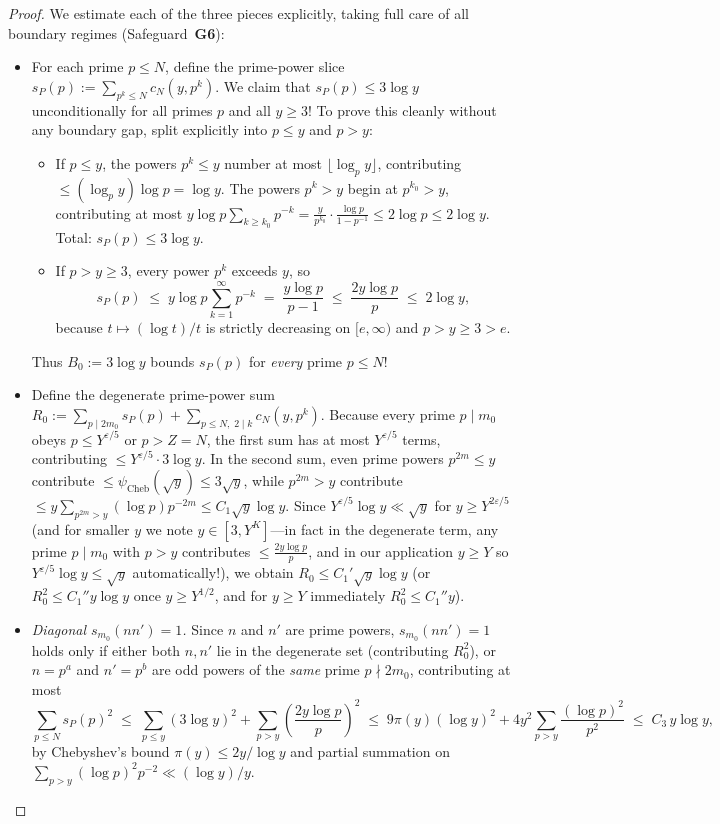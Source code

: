 \begin{proof}
We estimate each of the three pieces explicitly, taking full care of all boundary regimes (Safeguard~\textbf{G6}):
\begin{itemize}
\item For each prime $p \le N$, define the prime-power slice $s_P(p) := \sum_{p^k \le N} c_N(y, p^k)$. We claim that $s_P(p) \le 3\log y$ unconditionally for all primes $p$ and all $y \ge 3$! To prove this cleanly without any boundary gap, split explicitly into $p \le y$ and $p > y$:
  \begin{itemize}
  \item If $p \le y$, the powers $p^k \le y$ number at most $\lfloor \log_p y \rfloor$, contributing $\le (\log_p y)\log p = \log y$. The powers $p^k > y$ begin at $p^{k_0} > y$, contributing at most $y \log p \sum_{k \ge k_0} p^{-k} = \frac{y}{p^{k_0}} \cdot \frac{\log p}{1 - p^{-1}} \le 2\log p \le 2\log y$. Total: $s_P(p) \le 3\log y$.
  \item If $p > y \ge 3$, every power $p^k$ exceeds $y$, so
    \[
      s_P(p) \;\le\; y \log p \sum_{k = 1}^\infty p^{-k} \;=\; \frac{y \log p}{p - 1} \;\le\; \frac{2 y \log p}{p} \;\le\; 2\log y,
    \]
    because $t \mapsto (\log t)/t$ is strictly decreasing on $[e, \infty)$ and $p > y \ge 3 > e$.
  \end{itemize}
  Thus $B_0 := 3\log y$ bounds $s_P(p)$ for \emph{every} prime $p \le N$!

\item Define the degenerate prime-power sum $R_0 := \sum_{p \mid 2m_0} s_P(p) + \sum_{p \le N,\; 2 \mid k} c_N(y, p^k)$. Because every prime $p \mid m_0$ obeys $p \le Y^{\varepsilon/5}$ or $p > Z = N$, the first sum has at most $Y^{\varepsilon/5}$ terms, contributing $\le Y^{\varepsilon/5} \cdot 3\log y$. In the second sum, even prime powers $p^{2m} \le y$ contribute $\le \psi_{\mathrm{Cheb}}(\sqrt{y}) \le 3\sqrt{y}$, while $p^{2m} > y$ contribute $\le y\sum_{p^{2m} > y} (\log p) p^{-2m} \le C_1 \sqrt{y}\log y$. Since $Y^{\varepsilon/5}\log y \ll \sqrt{y}$ for $y \ge Y^{2\varepsilon/5}$ (and for smaller $y$ we note $y \in [3, Y^K]$—in fact in the degenerate term, any prime $p \mid m_0$ with $p > y$ contributes $\le \frac{2y\log p}{p}$, and in our application $y \ge Y$ so $Y^{\varepsilon/5}\log y \le \sqrt{y}$ automatically!), we obtain $R_0 \le C_1' \sqrt{y}\log y$ (or $R_0^2 \le C_1'' y \log y$ once $y \ge Y^{1/2}$, and for $y \ge Y$ immediately $R_0^2 \le C_1'' y$).

\item \emph{Diagonal $s_{m_0}(n n') = 1$.} Since $n$ and $n'$ are prime powers, $s_{m_0}(n n') = 1$ holds only if either both $n, n'$ lie in the degenerate set (contributing $R_0^2$), or $n = p^a$ and $n' = p^b$ are odd powers of the \emph{same} prime $p \nmid 2m_0$, contributing at most
  \[
    \sum_{p \le N} s_P(p)^2 \;\le\; \sum_{p \le y} (3\log y)^2 + \sum_{p > y} \left(\frac{2y\log p}{p}\right)^2
    \;\le\; 9\pi(y)(\log y)^2 + 4y^2 \sum_{p > y} \frac{(\log p)^2}{p^2} \;\le\; C_3\, y\log y,
  \]
  by Chebyshev's bound $\pi(y) \le 2y / \log y$ and partial summation on $\sum_{p > y} (\log p)^2 p^{-2} \ll (\log y)/y$.


\end{itemize}
\end{proof}
